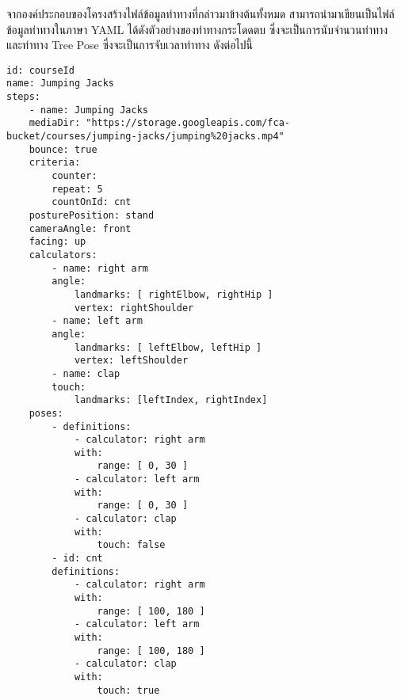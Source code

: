 จากองค์ประกอบของโครงสร้างไฟล์ข้อมูลท่าทางที่กล่าวมาข้างต้นทั้งหมด สามารถนำมาเขียนเป็นไฟล์ข้อมูลท่าทางในภาษา YAML ได้ดังตัวอย่างของท่าทางกระโดดตบ ซึ่งจะเป็นการนับจำนวนท่าทาง และท่าทาง Tree Pose ซึ่งจะเป็นการจับเวลาท่าทาง ดังต่อไปนี้
\begin{lstlisting}[caption=ตัวอย่างไฟล์ข้อมูลท่าทางของท่าทางกระโดดตบ (Jumping Jacks)]
id: courseId
name: Jumping Jacks
steps:
    - name: Jumping Jacks
    mediaDir: "https://storage.googleapis.com/fca-bucket/courses/jumping-jacks/jumping%20jacks.mp4"
    bounce: true
    criteria:
        counter:
        repeat: 5
        countOnId: cnt
    posturePosition: stand
    cameraAngle: front
    facing: up
    calculators:
        - name: right arm
        angle:
            landmarks: [ rightElbow, rightHip ]
            vertex: rightShoulder
        - name: left arm
        angle:
            landmarks: [ leftElbow, leftHip ]
            vertex: leftShoulder
        - name: clap
        touch:
            landmarks: [leftIndex, rightIndex]
    poses:
        - definitions:
            - calculator: right arm
            with:
                range: [ 0, 30 ]
            - calculator: left arm
            with:
                range: [ 0, 30 ]
            - calculator: clap
            with:
                touch: false
        - id: cnt
        definitions:
            - calculator: right arm
            with:
                range: [ 100, 180 ]
            - calculator: left arm
            with:
                range: [ 100, 180 ]
            - calculator: clap
            with:
                touch: true    
\end{lstlisting}
